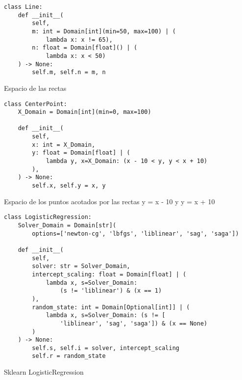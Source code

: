 
\begin{codesample}

\begin{listing}[!ht]
    \begin{verbatim}
class Line:
    def __init__(
        self,
        m: int = Domain[int](min=50, max=100) | (
            lambda x: x != 65),
        n: float = Domain[float]() | (
            lambda x: x < 50)
    ) -> None:
        self.m, self.n = m, n
    \end{verbatim}
    \caption{Espacio de las rectas}
    \label{lst:rectas}
\end{listing}


\begin{listing}[!ht]
    \begin{verbatim}
class CenterPoint:
    X_Domain = Domain[int](min=0, max=100)

    def __init__(
        self,
        x: int = X_Domain,
        y: float = Domain[float] | (
            lambda y, x=X_Domain: (x - 10 < y, y < x + 10)
        ),
    ) -> None:
        self.x, self.y = x, y
    \end{verbatim}
    \caption{Espacio de los puntos acotados por las rectas y = x - 10 y y = x + 10}
    \label{lst:points}
\end{listing}

\begin{listing}[!ht]
    \begin{verbatim}
class LogisticRegression:
    Solver_Domain = Domain[str](
        options=['newton-cg', 'lbfgs', 'liblinear', 'sag', 'saga'])

    def __init__(
        self,
        solver: str = Solver_Domain,
        intercept_scaling: float = Domain[float] | (
            lambda x, s=Solver_Domain: 
                (s != 'liblinear') & (x == 1)
        ),
        random_state: int = Domain[Optional[int]] | (
            lambda x, s=Solver_Domain: (s != [
                'liblinear', 'sag', 'saga']) & (x == None)
        )
    ) -> None:
        self.s, self.i = solver, intercept_scaling
        self.r = random_state
    \end{verbatim}
    \caption{Sklearn LogisticRegression}
    \label{lst:sklearn}
\end{listing}


\end{codesample}
